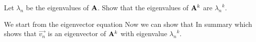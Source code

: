 Let $\lambda_n$ be the eigenvalues of $\bf A$. Show that the eigenvalues of ${\bf A}^k$ are ${\lambda_n}^k$. 

\solution 

We start from the eigenvector equation 
Now we can show that 
In summary 
which shows that $\vec{v_n}$ is an eigenvector of ${\bf A}^k$ with eigenvalue ${\lambda_n}^k$.


